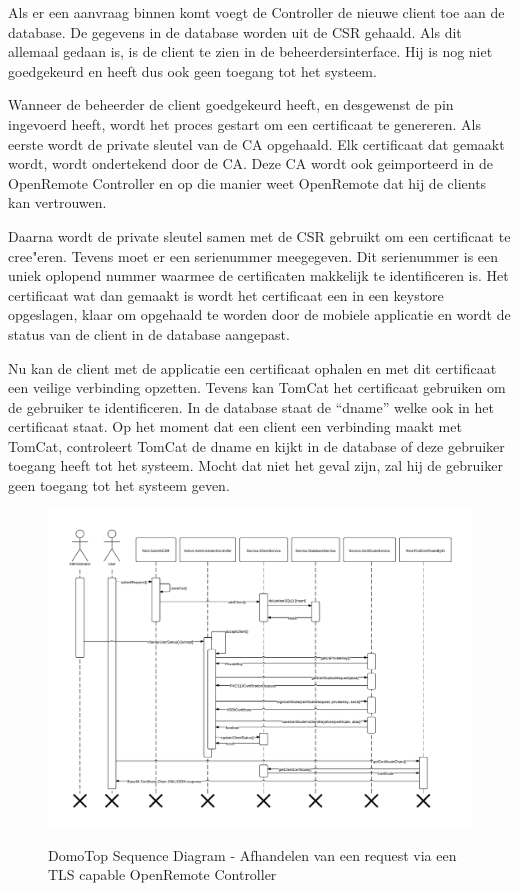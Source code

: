 \documentclass[]{article}
\begin{document}
Als er een aanvraag binnen komt voegt de Controller de nieuwe client toe aan de
database. De gegevens in de database worden uit de CSR gehaald. Als dit allemaal
gedaan is, is de client te zien in de beheerdersinterface. Hij is nog niet
goedgekeurd en heeft dus ook geen toegang tot het systeem.

Wanneer de beheerder de client goedgekeurd heeft, en desgewenst de pin ingevoerd
heeft, wordt het proces gestart om een certificaat te genereren. Als eerste
wordt de private sleutel van de CA opgehaald. Elk certificaat dat gemaakt wordt,
wordt ondertekend door de CA. Deze CA wordt ook geimporteerd in de OpenRemote
Controller en op die manier weet OpenRemote dat hij de clients kan vertrouwen.

Daarna wordt de private sleutel samen met de CSR gebruikt om een certificaat te
cree"eren. Tevens moet er een serienummer meegegeven. Dit serienummer is een
uniek oplopend nummer waarmee de certificaten makkelijk te identificeren is. Het
certificaat wat dan gemaakt is wordt het certificaat een in een keystore
opgeslagen, klaar om opgehaald te worden door de mobiele applicatie en wordt de
status van de client in de database aangepast.

Nu kan de client met de applicatie een certificaat ophalen en met dit
certificaat een veilige verbinding opzetten. Tevens kan TomCat het certificaat
gebruiken om de gebruiker te identificeren. In de database staat de ``dname''
welke ook in het certificaat staat. Op het moment dat een client een verbinding
maakt met TomCat, controleert TomCat de dname en kijkt in de database of deze
gebruiker toegang heeft tot het systeem. Mocht dat niet het geval zijn, zal hij
de gebruiker geen toegang tot het systeem geven.


\begin{landscape}
\begin{figure}[h!]
  \centering
    \includegraphics[height=1\textheight,keepaspectratio]{DomoTopSequenceDiagram_without_title.pdf}
  \label{fig:tls}
  \caption{DomoTop Sequence Diagram - Afhandelen van een request via een TLS
  capable OpenRemote Controller}
\end{figure}
\end{landscape}
\end{document}
